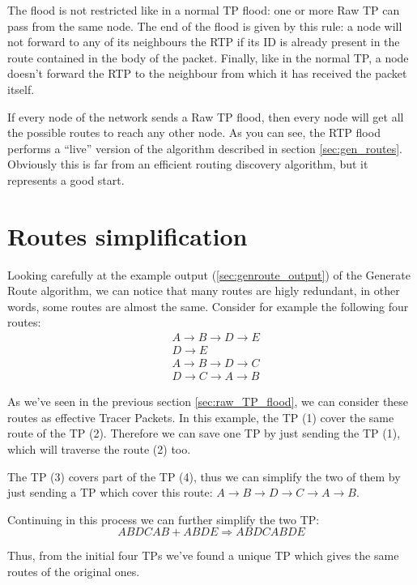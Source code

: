 \documentclass[a4paper]{article}
\begin{document}
The flood is not restricted like in a normal TP flood: one or more Raw TP can
pass from the same node. The end of the flood is given by this rule: a node
will not forward to any of its neighbours the RTP if its ID is already present
in the route contained in the body of the packet.
Finally, like in the normal TP, a node doesn't forward the RTP to the
neighbour from which it has received the packet itself.

If every node of the network sends a Raw TP flood, then every node will get
all the possible routes to reach any other node.
\newline
As you can see, the RTP flood performs a ``live'' version of the algorithm
described in section \ref{sec:gen_routes}.
Obviously this is far from an efficient routing discovery algorithm, but it
represents a good start.

\section{Routes simplification}
\label{sec:simplify_routes}

Looking carefully at the example output (\ref{sec:genroute_output}) of the
Generate Route algorithm, we can notice that many routes are higly redundant,
in other words, some routes are almost the same.
Consider for example the following four routes:
\begin{align}
	& A \rightarrow B \rightarrow D \rightarrow E \label{eq:e1}\\
	& D \rightarrow E \label{eq:e2} \\
	& A \rightarrow B \rightarrow D \rightarrow C \label{eq:e3}\\
	& D \rightarrow C \rightarrow A \rightarrow B \label{eq:e4}
\end{align}

As we've seen in the previous section \ref{sec:raw_TP_flood}, we can consider
these routes as effective Tracer Packets.
In this example, the TP (1) cover the same route of the TP
(2). Therefore we can save one TP by just sending the TP
(1), which will traverse the route (2) too.

The TP (3) covers part of the TP (4), thus we can simplify
the two of them by just sending a TP which cover this route: $A \rightarrow B
\rightarrow D \rightarrow C \rightarrow A \rightarrow B$.

Continuing in this process we can further simplify the two TP:
\[ ABDCAB + ABDE \Rightarrow  ABDCABDE \]

Thus, from the initial four TPs we've found a unique TP which gives the same
routes of the original ones.
\end{document}

